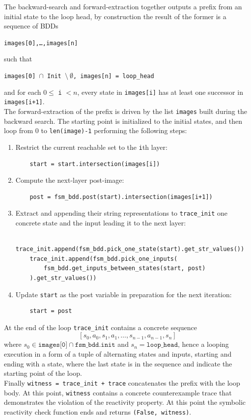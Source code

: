 The backward-search and forward-extraction together outputs a prefix from an initial state to the loop head, by construction the result of the former is a sequence of BDDs
\begin{center}
\texttt{images[0],…,images[n]}
\end{center}
such that
\begin{center}
\texttt{images[0] }\(\cap\)\texttt{ Init }\(\setminus \ \emptyset\)\texttt{, images[n] = {loop\_head}}
\end{center}
and for each \(0 \le\) \texttt{i} \(< n\), every state in \texttt{images[i]} has at 
least one successor in 
\texttt{images[i+1]}.\\[2ex]
The forward-extraction of the prefix is driven by the list \texttt{images} built during the backward search. The starting point is initialized to the initial states, and then loop from 0 to \texttt{len(image)-1} performing the following steps:
\begin{enumerate}
  \item Restrict the current reachable set to the \texttt{i}th layer:
        \scriptsize
        \begin{verbatim}
    start = start.intersection(images[i])
        \end{verbatim}
  \item Compute the next-layer post-image:
        \scriptsize
        \begin{verbatim}
    post = fsm_bdd.post(start).intersection(images[i+1])
        \end{verbatim}
  \item Extract and appending their string representations to \texttt{trace\_init} one 
        concrete state and the input leading it to the next layer:
        \scriptsize
        \begin{verbatim}
    trace_init.append(fsm_bdd.pick_one_state(start).get_str_values())
    trace_init.append(fsm_bdd.pick_one_inputs(
        fsm_bdd.get_inputs_between_states(start, post)
    ).get_str_values())
        \end{verbatim}
  \item Update \texttt{start} as the post variable in preparation for the next iteration:
        \scriptsize
        \begin{verbatim}
    start = post
        \end{verbatim}
\end{enumerate}
At the end of the loop \texttt{trace\_init} contains a concrete sequence  
\[
[s_0, a_0, s_1, a_1, \dots, s_{n-1}, a_{n-1}, s_n]
\]
where \(s_0\in\texttt{images[0]}\cap\texttt{fsm\_bdd.init}\) and \(s_n=\texttt{loop\_head}\), hence a looping execution in a form of a tuple of alternating states and inputs, starting and ending with a state, where the last state is in the sequence and indicate the starting point of the loop.\\[2ex]  
Finally \texttt{witness = trace\_init + trace} concatenates the prefix with the loop body. At this point, \texttt{witness} contains a concrete counterexample trace that demonstrates the violation of the reactivity property. At this point the symbolic reactivity check function ends and returns \texttt{(False, witness)}.